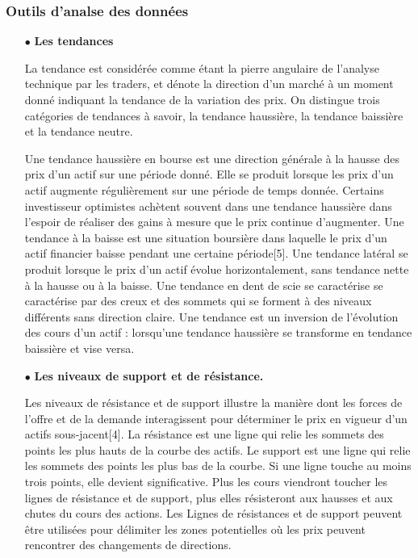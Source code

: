 \newpage
\subsubsection{Outils d'analse des données}
\begin{itemize}
	\item[$\bullet$] \textbf{Les tendances}
    \par{La tendance est considérée comme étant la pierre angulaire de l'analyse technique par les traders, et 
    dénote la direction d'un marché à un moment donné indiquant la tendance de la variation des prix.
    On distingue trois catégories de tendances à savoir, la tendance haussière, la tendance baissière et 
    la tendance neutre. 

    Une tendance haussière en bourse est une direction générale à la hausse des prix d'un actif sur une période
    donné. Elle se produit lorsque les prix d'un actif augmente régulièrement sur une période de temps donnée.
    Certains investisseur optimistes achètent souvent dans une tendance haussière dans l'espoir de réaliser des 
    gains à mesure que le prix continue d'augmenter.
    Une tendance à la baisse est une situation boursière dans laquelle le prix d'un actif financier baisse pendant 
    une certaine période[5]. 
    Une tendance latéral se produit lorsque le prix d'un actif évolue horizontalement, sans tendance nette à la 
    hausse ou à la baisse.
    Une tendance en dent de scie se caractérise se caractérise par des creux et des sommets qui se forment à des 
    niveaux différents sans direction claire.
    Une tendance est un inversion de l'évolution des cours d'un actif : lorsqu'une tendance haussière se transforme
    en tendance baissière et vise versa. }

    \item[$\bullet$] \textbf{Les niveaux de support et de résistance.}
    \par{Les niveaux de résistance et de support illustre la manière dont les forces de l'offre et de la demande interagissent 
    pour déterminer le prix en vigueur d'un actifs sous-jacent[4]. La résistance est une ligne qui relie les sommets des 
    points les plus hauts de la courbe des actifs. Le support est une ligne qui relie les sommets des 
    points les plus bas de la courbe. Si une ligne touche au moins trois points, elle devient significative.
    Plus les cours viendront toucher les lignes de résistance et de support, plus elles résisteront aux hausses et aux 
    chutes du cours des actions. Les Lignes de résistances et de support peuvent être utilisées pour délimiter les zones 
    potentielles où les prix peuvent rencontrer des changements de directions.

}
\end{itemize}
